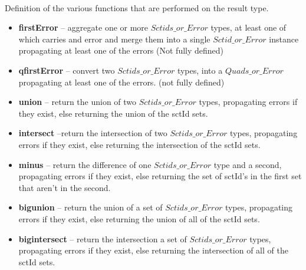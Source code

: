 \documentclass{article}
\begin{document}
\paragraph{}
Definition of the various functions that are performed on the result type. \\
\begin{itemize}[noitemsep,nolistsep]
\item \textbf{firstError} -- aggregate one or more $Sctids\_or\_Error$ types, at least one of which carries and error and merge them into a single $Sctid\_or\_Error$ instance propagating at least one of the errors (Not fully defined)
\item \textbf{qfirstError} -- convert two $Sctids\_or\_Error$ types, into a $Quads\_or\_Error$ propagating at least one of the errors. (not fully defined)
\end{itemize}

\begin{itemize}[noitemsep]
\item \textbf{union} -- return the union of two $Sctids\_or\_Error$ types, propagating errors if they exist, else returning the union of the sctId sets.
\item \textbf{intersect} --return the intersection of two $Sctids\_or\_Error$ types, propagating errors if they exist, else returning the intersection of the sctId sets.
\item \textbf{minus} -- return the difference of one $Sctids\_or\_Error$ type and a second, propagating errors if they exist, else returning the set of sctId's in the first set that aren't in the second. 
\item \textbf{bigunion} -- return the union of a set of $Sctids\_or\_Error$ types, propagating errors if they exist, else returning the union of  all of the sctId sets.
\item \textbf{bigintersect} -- return the intersection a set of $Sctids\_or\_Error$ types, propagating errors if they exist, else returning the intersection of all of  the sctId sets.
\end{itemize}
\end{document}
